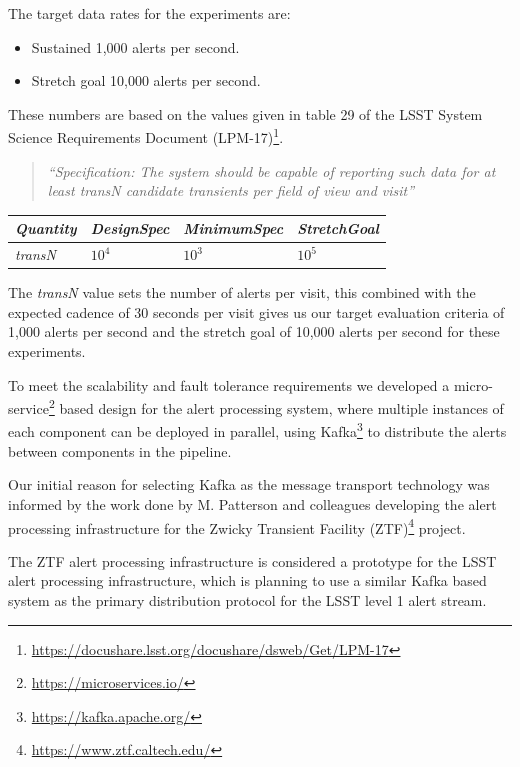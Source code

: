 \documentclass{article}
\newcommand{\kafka} {Kafka\xspace}
\newcommand{\ztf} {ZTF\xspace}
\newcommand{\lsst} {LSST\xspace}
\newcommand{\footurl}[1] {\footnote{\url{#1}}}
\begin{document}
The target data rates for the experiments are:
\begin{itemize}
  \item Sustained 1,000 alerts per second.
  \item Stretch goal 10,000 alerts per second.
\end{itemize}

These numbers are based on the values given in table 29 of the \lsst System Science Requirements Document (LPM-17)\footurl{https://docushare.lsst.org/docushare/dsweb/Get/LPM-17}.

\begin{quote}
\textit{“Specification: The system should be capable of reporting such data for at least transN candidate transients per field of view and visit”}
\end{quote}

\begin{center}
\begin{tabular}{|l|l|l|l|}
\hline
\textit{Quantity} & \textit{DesignSpec} & \textit{MinimumSpec} & \textit{StretchGoal} \\ \hline
\textit{transN}   & $10^{4}$            & $10^{3}$             & $10^{5}$             \\ \hline
\end{tabular}
\end{center}

The \textit{transN} value sets the number of alerts per visit, this combined with the expected cadence of 30 seconds per visit gives us our target evaluation criteria of 1,000 alerts per second and the stretch goal of 10,000 alerts per second for these experiments.

To meet the scalability and fault tolerance requirements we developed a micro-service\footurl{https://microservices.io/} based design for the alert processing system, where multiple instances of each component can be deployed in parallel, using \kafka\footurl{https://kafka.apache.org/} to distribute the alerts between components in the pipeline.

Our initial reason for selecting \kafka as the message transport technology was informed by the work done by M. Patterson\cite{Patterson-2018} and colleagues developing the alert processing infrastructure for the Zwicky Transient Facility (ZTF)\footurl{https://www.ztf.caltech.edu/} project.

The \ztf alert processing infrastructure is considered a prototype for the \lsst alert processing infrastructure, which is planning to use a similar \kafka based system as the primary distribution protocol for the \lsst level 1 alert stream.
\end{document}
